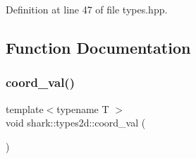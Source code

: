 Definition at line 47 of file types.\+hpp.



\subsection{Function Documentation}
\hypertarget{namespaceshark_1_1types2d_a2a01f3d69a9f4708ea61caf9dd6cb709}{}\label{namespaceshark_1_1types2d_a2a01f3d69a9f4708ea61caf9dd6cb709} 
\subsubsection{\texorpdfstring{coord\+\_\+val()}{coord\_val()}}
{\footnotesize\ttfamily template$<$typename T $>$ \\
void shark\+::types2d\+::coord\+\_\+val (\begin{DoxyParamCaption}{ }\end{DoxyParamCaption})}

